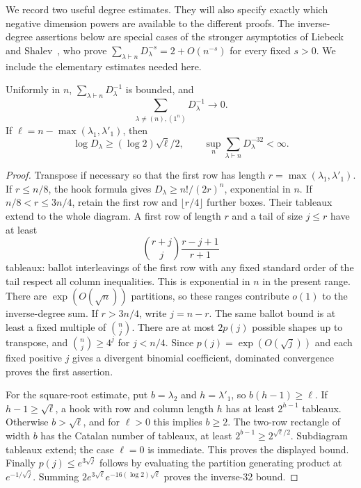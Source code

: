 We record two useful degree estimates. They will also specify exactly which negative dimension powers are available to the different proofs.
The inverse-degree assertions below are special cases of the stronger asymptotics of Liebeck and Shalev~\cite[Theorem~2.6]{liebeck-shalev2004}, who prove $\sum_{\lambda\vdash n}D_\lambda^{-s}=2+O(n^{-s})$ for every fixed $s>0$. We include the elementary estimates needed here.
\begin{lemma}\label{lem:degrees}
Uniformly in $n$, $\sum_{\lambda\vdash n}D_\lambda^{-1}$ is bounded, and
\[
 \sum_{\lambda\ne(n),(1^n)}D_\lambda^{-1}\longrightarrow0.
\]
If $\ell=n-\max(\lambda_1,\lambda'_1)$, then
\[
 \log D_\lambda\ge(\log2)\sqrt\ell/2,
 \qquad \sup_n\sum_{\lambda\vdash n}D_\lambda^{-32}<\infty.
\]
\end{lemma}
\begin{proof}
Transpose if necessary so that the first row has length $r=\max(\lambda_1,\lambda'_1)$. If $r\le n/8$, the hook formula gives $D_\lambda\ge n!/(2r)^n$, exponential in $n$. If $n/8<r\le3n/4$, retain the first row and $\lfloor r/4\rfloor$ further boxes. Their tableaux extend to the whole diagram. A first row of length $r$ and a tail of size $j\le r$ have at least
\[
 \binom{r+j}{j}\frac{r-j+1}{r+1}
\]
tableaux: ballot interleavings of the first row with any fixed standard order of the tail respect all column inequalities. This is exponential in $n$ in the present range. There are $\exp(O(\sqrt n))$ partitions, so these ranges contribute $o(1)$ to the inverse-degree sum. If $r>3n/4$, write $j=n-r$. The same ballot bound is at least a fixed multiple of $\binom nj$. There are at most $2p(j)$ possible shapes up to transpose, and $\binom nj\ge4^j$ for $j<n/4$. Since $p(j)=\exp(O(\sqrt j))$ and each fixed positive $j$ gives a divergent binomial coefficient, dominated convergence proves the first assertion.

For the square-root estimate, put $b=\lambda_2$ and $h=\lambda'_1$, so $b(h-1)\ge\ell$. If $h-1\ge\sqrt\ell$, a hook with row and column length $h$ has at least $2^{h-1}$ tableaux. Otherwise $b>\sqrt\ell$, and for $\ell>0$ this implies $b\ge2$. The two-row rectangle of width $b$ has the Catalan number of tableaux, at least $2^{b-1}\ge2^{\sqrt\ell/2}$. Subdiagram tableaux extend; the case $\ell=0$ is immediate. This proves the displayed bound. Finally $p(j)\le e^{3\sqrt j}$ follows by evaluating the partition generating product at $e^{-1/\sqrt j}$. Summing $2e^{3\sqrt\ell}e^{-16(\log2)\sqrt\ell}$ proves the inverse-32 bound.
\end{proof}

